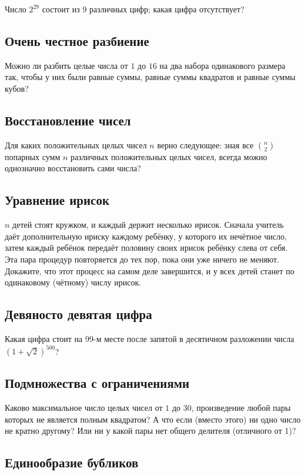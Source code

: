 Число $2^{29}$ состоит из $9$ различных цифр; какая цифра отсутствует?

\subsection*{Очень честное разбиение}

Можно ли разбить целые числа от $1$ до $16$ на два набора одинакового размера так,
чтобы у них были равные суммы, равные суммы квадратов и равные суммы кубов?

\subsection*{Восстановление чисел}
Для каких положительных целых чисел $n$ верно следующее: зная все $\binom n2$ попарных сумм $n$ различных положительных целых чисел, всегда можно однозначно восстановить сами числа?


\subsection*{Уравнение ирисок}

$n$ детей стоят кружком, и каждый держит несколько ирисок.
Сначала учитель даёт дополнительную ириску каждому ребёнку, у которого их нечётное число,
затем каждый ребёнок передаёт половину своих ирисок ребёнку слева от себя.
Эта пара процедур повторяется до тех пор, пока они уже ничего не меняют.
Докажите, что этот процесс на самом деле завершится, и у всех детей станет по одинаковому (чётному) числу ирисок.

\subsection*{Девяносто девятая цифра}

Какая цифра стоит на 99-м месте после запятой в десятичном разложении числа 
$(1+\sqrt2)^{500}$?

\subsection*{Подмножества с ограничениями}

Каково максимальное число целых чисел от $1$ до $30$, произведение любой пары которых не является полным квадратом?
А что если (вместо этого) ни одно число не кратно другому?
Или ни у какой пары нет общего делителя (отличного от 1)?

\subsection*{Единообразие бубликов}\label{Единообразие бубликов}

